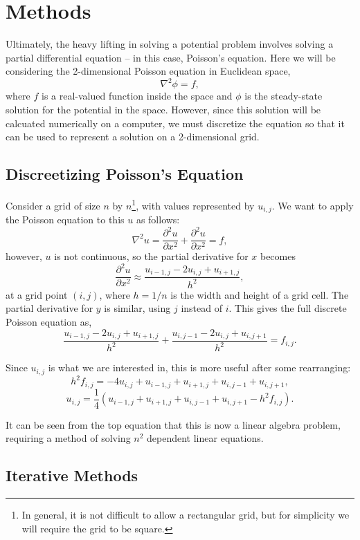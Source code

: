 \section{Methods}

Ultimately, the heavy lifting in solving a potential problem involves solving a partial
differential equation -- in this case, Poisson's equation. Here we will be considering
the 2-dimensional Poisson equation in Euclidean space,
$$\nabla^2 \phi = f,$$
where $f$ is a real-valued function inside the space and $\phi$ is the steady-state
solution for the potential in the space. However, since this solution will be calcuated
numerically on a computer, we must discretize the equation so that it can be used to
represent a solution on a 2-dimensional grid.

\subsection{Discreetizing Poisson's Equation}

Consider a grid of size $n$ by $n$\footnote{In general, it is not difficult to allow a rectangular grid, but for simplicity
we will require the grid to be square.}, with values represented by $u_{i,j}$. We want to apply the Poisson equation to
this $u$ as follows:
$$\nabla^2 u = \frac{\partial^2 u}{\partial x^2} + \frac{\partial^2 u}{\partial x^2} = f,$$
however, $u$ is not continuous, so the partial derivative for $x$ becomes
$$\frac{\partial^2 u}{\partial x^2} \approx \frac{u_{i-1,j} - 2 u_{i,j} + u_{i+1,j}}{h^2},$$
at a grid point $(i,j)$, where $h = 1 / n$ is the width and height of a grid cell. The partial derivative for $y$ is similar, using $j$ instead of $i$.
This gives the full discrete Poisson equation as,
$$\frac{u_{i-1,j} - 2 u_{i,j} + u_{i+1,j}}{h^2} + \frac{u_{i,j-1} - 2 u_{i,j} + u_{i,j+1}}{h^2} = f_{i,j}.$$

Since $u_{i,j}$ is what we are interested in, this is more useful after some rearranging:
$$h^2f_{i,j} = -4u_{i,j} + u_{i-1,j} + u_{i+1,j} + u_{i,j-1} + u_{i,j+1},$$
\begin{equation} \label{eq:poisson}
u_{i,j} = \frac{1}{4}(u_{i-1,j} + u_{i+1,j} + u_{i,j-1} + u_{i,j+1} - h^2f_{i,j}).
\end{equation}

It can be seen from the top equation that this is now a linear algebra problem, requiring a method of solving
$n^2$ dependent linear equations.

\subsection{Iterative Methods}

